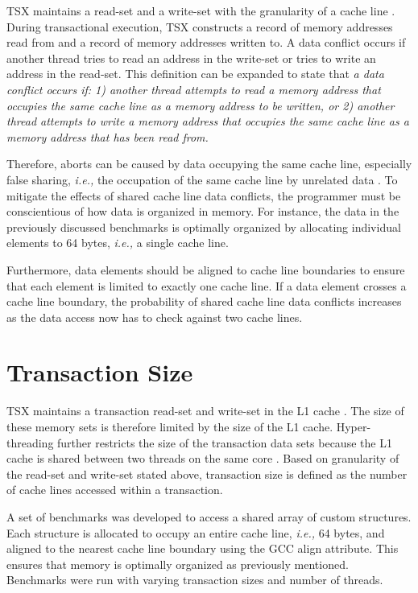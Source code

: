\documentclass[11pt]{book}
\begin{document}
TSX maintains a read-set and a write-set with the granularity of a cache line
\cite{intel_prog_ref}.  During transactional execution, TSX constructs a record of memory
addresses read from and a record of memory addresses written to.  A data conflict occurs
if another thread tries to read an address in the write-set or tries to write an address
in the read-set.  This definition can be expanded to state that \emph{a data conflict
  occurs if: 1) another thread attempts to read a memory address that occupies the same
  cache line as a memory address to be written, or 2) another thread attempts to write a
  memory address that occupies the same cache line as a memory address that has been read
  from.}

Therefore, aborts can be caused by data occupying the same cache line, especially false
sharing, \emph{i.e.,} the occupation of the same cache line by unrelated data
\cite{intel_opt_man}.  To mitigate the effects of shared cache line data conflicts, the
programmer must be conscientious of how data is organized in memory.  For instance, the
data in the previously discussed benchmarks is optimally organized by allocating
individual elements to 64 bytes, \emph{i.e.,} a single cache line.

Furthermore, data elements should be aligned to cache line boundaries to ensure that each
element is limited to exactly one cache line.  If a data element crosses a cache line
boundary, the probability of shared cache line data conflicts increases as the data access
now has to check against two cache lines.

\section{Transaction Size}

TSX maintains a transaction read-set and write-set in the L1 cache \cite{intel_opt_man}.
The size of these memory sets is therefore limited by the size of the L1 cache.
Hyper-threading further restricts the size of the transaction data sets because the L1
cache is shared between two threads on the same core \cite{intel_opt_man}.  Based on
granularity of the read-set and write-set stated above, transaction size is defined as the
number of cache lines accessed within a transaction.

A set of benchmarks was developed to access a shared array of custom structures. Each
structure is allocated to occupy an entire cache line, \emph{i.e.,} 64 bytes, and aligned to the
nearest cache line boundary using the GCC align attribute.  This ensures that memory is
optimally organized as previously mentioned.  Benchmarks were run with varying transaction
sizes and number of threads.
\end{document}
